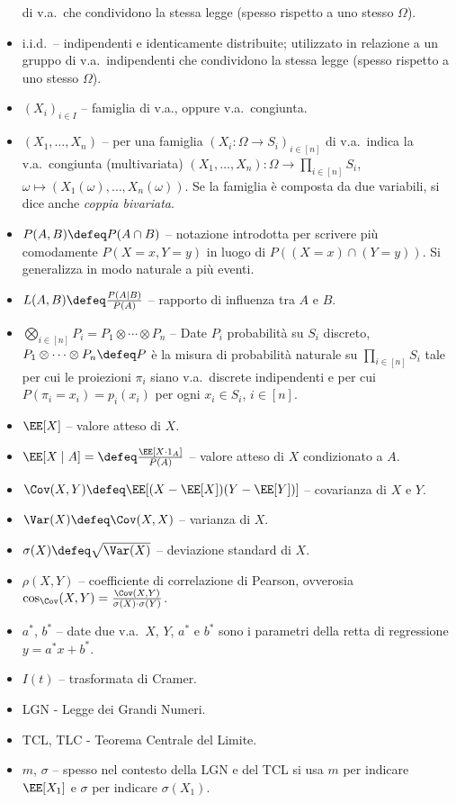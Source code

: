 \begin{multicols*}{2}
\begin{itemize}
        di v.a.~che condividono la stessa legge (spesso rispetto a uno stesso $\Omega$).
        \item i.i.d.~-- indipendenti e identicamente distribuite; utilizzato in relazione
        a un gruppo di v.a.~indipendenti che condividono la stessa legge (spesso rispetto
        a uno stesso $\Omega$).
        \item $(X_i)_{i \in I}$ -- famiglia di v.a., oppure v.a.~congiunta.
        \item $(X_1, \ldots, X_n)$ -- per una famiglia $(X_i : \Omega \to S_i)_{i \in [n]}$ di
        v.a.~indica la v.a.~congiunta (multivariata) $(X_1, \ldots, X_n) : \Omega \to \prod_{i \in [n]} S_i$, $\omega \mapsto (X_1(\omega), \ldots, X_n(\omega))$. Se la
        famiglia è composta da due variabili, si dice anche \textit{coppia bivariata}.
        \item $P(A, B) \defeq P(A \cap B)$ -- notazione introdotta per scrivere
        più comodamente $P(X = x, Y = y)$ in luogo di $P((X = x) \cap (Y = y))$. Si
        generalizza in modo naturale a più eventi.
        \item $L(A, B) \defeq \frac{P(A \mid B)}{P(A)}$ -- rapporto di influenza tra
        $A$ e $B$.
        \item $\bigotimes_{i \in [n]} P_i = P_1 \otimes \cdots \otimes P_n$ --
        Date $P_i$ probabilità su $S_i$ discreto, $P_1 \otimes \cdots \otimes P_n \defeq P$ è la misura di probabilità naturale su $\prod_{i \in [n]} S_i$ tale per cui
        le proiezioni $\pi_i$ siano v.a.~discrete indipendenti e per cui
        $P(\pi_i = x_i) = p_i(x_i)$ per ogni $x_i \in S_i$, $i \in [n]$.
        \item $\EE[X]$ -- valore atteso di $X$.
        \item $\EE[X \mid A] = \defeq \frac{\EE[X \cdot 1_A]}{P(A)}$ -- valore atteso di $X$
        condizionato a $A$.
        \item $\Cov(X, Y) \defeq \EE[(X - \EE[X])(Y - \EE[Y])]$ -- covarianza di $X$ e $Y$.
        \item $\Var(X) \defeq \Cov(X, X)$ -- varianza di $X$.
        \item $\sigma(X) \defeq \sqrt{\Var(X)}$ -- deviazione standard di $X$.
        \item $\rho(X, Y)$ -- coefficiente
        di correlazione di Pearson, ovverosia
        $\cos_{\Cov}(X, Y) = \frac{\Cov(X, Y)}{\sigma(X) \cdot \sigma(Y)}$.
        \item $a^*$, $b^*$ -- date due
        v.a.~$X$, $Y$, $a^*$ e $b^*$ sono
        i parametri della retta di
        regressione $y = a^*x + b^*$.
        \item $I(t)$ -- trasformata di Cramer.
        \item LGN - Legge dei Grandi Numeri.
        \item TCL, TLC - Teorema Centrale del Limite.
        \item $m$, $\sigma$ -- spesso nel contesto
        della LGN e del TCL si usa $m$ per
        indicare $\EE[X_1]$ e $\sigma$ per
        indicare $\sigma(X_1)$.
    \end{itemize}
\end{multicols*}
